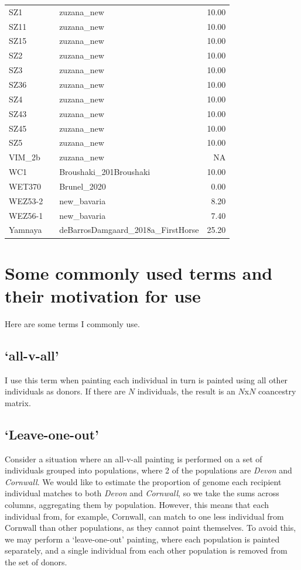 \begin{longtable}[t]{lllr}
SZ1 &  & zuzana\_new & 10.00\\
SZ11 &  & zuzana\_new & 10.00\\
SZ15 &  & zuzana\_new & 10.00\\
SZ2 &  & zuzana\_new & 10.00\\
SZ3 &  & zuzana\_new & 10.00\\
SZ36 &  & zuzana\_new & 10.00\\
SZ4 &  & zuzana\_new & 10.00\\
SZ43 &  & zuzana\_new & 10.00\\
SZ45 &  & zuzana\_new & 10.00\\
SZ5 &  & zuzana\_new & 10.00\\
VIM\_2b &  & zuzana\_new & NA\\
WC1 &  & Broushaki\_201Broushaki & 10.00\\
WET370 &  & Brunel\_2020 & 0.00\\
WEZ53-2 &  & new\_bavaria & 8.20\\
WEZ56-1 &  & new\_bavaria & 7.40\\
Yamnaya &  & deBarrosDamgaard\_2018a\_FirstHorse & 25.20\\*
\end{longtable}
\endgroup{}





\chapter{Some commonly used terms and their motivation for use}
\label{appendixlabel2}

Here are some terms I commonly use.

\section{`all-v-all'} \label{sec:allvall}

I use this term when painting each individual in turn is painted using all other individuals as donors. If there are $N$ individuals, the result is an $N$x$N$ coancestry matrix.


\section{`Leave-one-out'} \label{sec:leave_one_out}

Consider a situation where an all-v-all painting is performed on a set of individuals grouped into populations, where 2 of the populations are \textit{Devon} and \textit{Cornwall}. We would like to estimate the proportion of genome each recipient individual matches to both \textit{Devon} and \textit{Cornwall}, so we take the sums across columns, aggregating them by population. However, this means that each individual from, for example, Cornwall, can match to one less individual from Cornwall than other populations, as they cannot paint themselves. To avoid this, we may perform a `leave-one-out' painting, where each population is painted separately, and a single individual from each other population is removed from the set of donors. 

